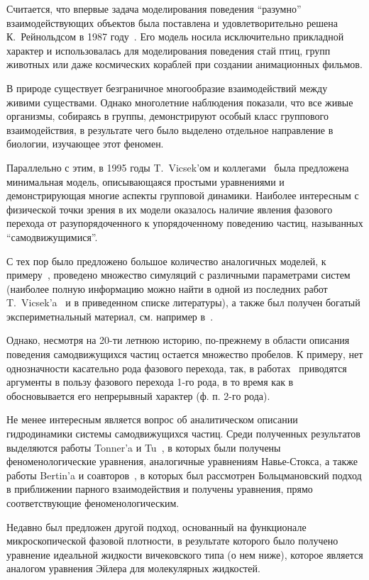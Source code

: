 
Считается, что впервые задача моделирования поведения ``разумно'' взаимодействующих объектов была поставлена и удовлетворительно решена К.~Рейнольдсом в 1987 году~\cite{reynolds1987}. Его модель носила исключительно прикладной характер и использовалась для моделирования поведения стай птиц, групп животных или даже космических кораблей при создании анимационных фильмов.

В природе существует безграничное многообразие взаимодействий между живими существами. Однако многолетние наблюдения показали, что все живые организмы, собираясь в группы, демонстрируют особый класс группового взаимодействия, в результате чего было выделено отдельное направление в биологии, изучающее этот феномен.

Параллельно с этим, в 1995 годы T.~Vicsek'ом и коллегами~\cite{vicsek1995} была предложена минимальная модель, описывающаяся простыми уравнениями и демонстрирующая многие аспекты групповой динамики. Наиболее интересным с физической точки зрения в их модели оказалось наличие явления фазового перехода от разупорядоченного к упорядоченному поведению частиц, называнных ``самодвижущимися''.

С тех пор было предложено большое количество аналогичных моделей, к примеру~\cite{gregoire2004,schubring2013,kuemmel2013,huepe2008,chate2008,tu2000}, проведено множество симуляций с различными параметрами систем (наиболее полную информацию можно найти в одной из последних работ T.~Vicsek'a~\cite{vicsek2012} и в приведенном списке литературы), а также был получен богатый экспериметнальный материал, см. например в~\cite{keller1971,chowdhury2006,czirok1999,csahok1997,buhl2006,ballerini2008,selous1931,dellariccia2008,biro2006,major1978,cambui2012,makris2006,parrish1997,sinclair1977}.

Однако, несмотря на 20-ти летнюю историю, по-прежнему в области описания поведения самодвижущихся частиц остается множество пробелов. К примеру, нет однозначности касательно рода фазового перехода, так, в работах~\cite{gregoire2004,aldana2009} приводятся аргументы в пользу фазового перехода 1-го рода, в то время как в~\cite{vicsek1995,czirok1999,huepe2008} обосновывается его непрерывный характер (ф. п. 2-го рода).

Не менее интересным является вопрос об аналитическом описании гидродинамики системы самодвижущихся частиц.  Среди полученных результатов выделяются работы Tonner'a и Tu~\cite{toner1995,tu2000}, в которых были получены феноменологические уравнения, аналогичные уравнениям Навье-Стокса, а также работы Bertin'a и соавторов~\cite{bertin2006}, в которых был рассмотрен Больцмановский подход в приближении парного взаимодействия и получены уравнения, прямо соответствующие феноменологическим.

Недавно был предложен другой подход, основанный на функционале микроскопической фазовой плотности, в результате которого было получено уравнение идеальной жидкости вичековского типа (о нем ниже), которое является аналогом уравнения Эйлера для молекулярных жидкостей.